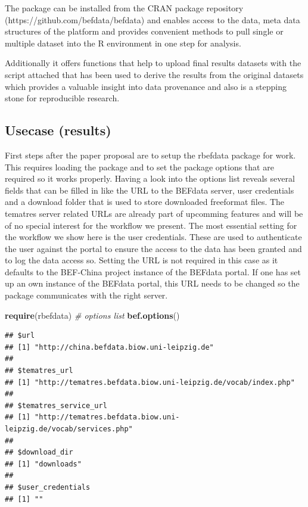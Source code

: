 \documentclass[]{article}
\newenvironment{Shaded}{}{}
\newcommand{\KeywordTok}[1]{\textcolor[rgb]{0.00,0.44,0.13}{\textbf{{#1}}}}
\newcommand{\CommentTok}[1]{\textcolor[rgb]{0.38,0.63,0.69}{\textit{{#1}}}}
\newcommand{\NormalTok}[1]{{#1}}
\begin{document}
The package can be installed from the CRAN package repository
(https://github.com/befdata/befdata) and enables access to the data,
meta data structures of the platform and provides convenient methods to
pull single or multiple dataset into the R environment in one step for
analysis.

Additionally it offers functions that help to upload final results
datasets with the script attached that has been used to derive the
results from the original datasets which provides a valuable insight
into data provenance and also is a stepping stone for reproducible
research.

\subsection{Usecase (results)}

First steps after the paper proposal are to setup the rbefdata package
for work. This requires loading the package and to set the package
options that are required so it works properly. Having a look into the
options list reveals several fields that can be filled in like the URL
to the BEFdata server, user credentials and a download folder that is
used to store downloaded freeformat files. The tematres server related
URLs are already part of upcomming features and will be of no special
interest for the workflow we present. The most essential setting for the
workflow we show here is the user credentials. These are used to
authenticate the user against the portal to ensure the access to the
data has been granted and to log the data access so. Setting the URL is
not required in this case as it defaults to the BEF-China project
instance of the BEFdata portal. If one has set up an own instance of the
BEFdata portal, this URL needs to be changed so the package communicates
with the right server.

\begin{Shaded}
\begin{Highlighting}[]
\KeywordTok{require}\NormalTok{(rbefdata)}
\CommentTok{# options list}
\KeywordTok{bef.options}\NormalTok{()}
\end{Highlighting}
\end{Shaded}

\begin{verbatim}
## $url
## [1] "http://china.befdata.biow.uni-leipzig.de"
## 
## $tematres_url
## [1] "http://tematres.befdata.biow.uni-leipzig.de/vocab/index.php"
## 
## $tematres_service_url
## [1] "http://tematres.befdata.biow.uni-leipzig.de/vocab/services.php"
## 
## $download_dir
## [1] "downloads"
## 
## $user_credentials
## [1] ""
\end{verbatim}
\end{document}
